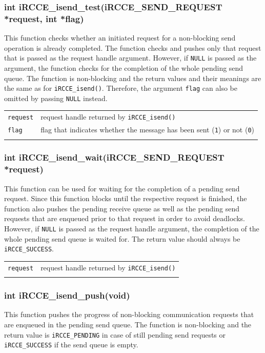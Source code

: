 \documentclass[fontsize=10pt, paper=a4, DIV12, pagesize=auto]{scrartcl}
\begin{document}
\subsubsection{int iRCCE\_isend\_test(iRCCE\_SEND\_REQUEST *request, int *flag)}\vspace{-0.3cm}
This function checks whether an initiated request for a non-blocking send operation is already completed.
The function checks and pushes only that request that is passed as the request handle argument.
However, if \texttt{NULL} is passed as the argument, the function checks for the completion of the whole pending send queue.
The function is non-blocking and the return values and their meanings are the same as for \texttt{iRCCE\_isend()}.
Therefore, the argument \texttt{flag} can also be omitted by passing \texttt{NULL} instead.

\begin{tabular}{ll}
\texttt{request} & request handle returned by \texttt{iRCCE\_isend()} \\
\texttt{flag}    & flag that indicates whether the message has been sent (\texttt{1}) or not (\texttt{0})\\
\hspace{2.0cm}
\end{tabular}


\subsubsection{int iRCCE\_isend\_wait(iRCCE\_SEND\_REQUEST *request)}\vspace{-0.3cm}
This function can be used for waiting for the completion of a pending send request.
Since this function blocks until the respective request is finished, the function also pushes the pending receive queue as well as the pending send requests that are enqueued prior to that request in order to avoid deadlocks.
However, if \texttt{NULL} is passed as the request handle argument, the completion of the whole pending send queue is waited for.
The return value should always be \texttt{iRCCE\_SUCCESS}.

\begin{tabular}{ll}
\texttt{request} & request handle returned by \texttt{iRCCE\_isend()} \\
\hspace{2.0cm}
\end{tabular}


\subsubsection{int iRCCE\_isend\_push(void)}\vspace{-0.3cm}
This function pushes the progress of non-blocking communication requests that are enqueued in the pending send queue.
The function is non-blocking and the return value is \texttt{iRCCE\_PENDING} in case of still pending send requests or \texttt{iRCCE\_SUCCESS} if the send queue is empty.
\end{document}
